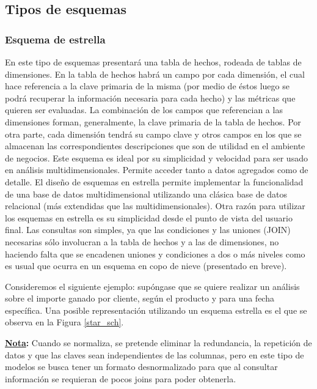 \documentclass[a4paper,11pt]{article}
\begin{document}
\begin{flushleft}
    
    \subsection{Tipos de esquemas}
    
    \subsubsection{Esquema de estrella}
    
    En este tipo de esquemas presentará una tabla de hechos, rodeada de tablas de dimensiones. En la tabla de hechos habrá un campo por cada dimensión, el
    cual hace referencia a la clave primaria de la misma (por medio de éstos luego se podrá recuperar la información necesaria para cada hecho) 
    y las métricas que quieren ser evaluadas. La combinación de los campos que referencian a las dimensiones forman, generalmente, la clave primaria de la
    tabla de hechos. Por otra parte, cada dimensión tendrá su campo clave y otros campos en los que se almacenan las correspondientes descripciones que son 
    de utilidad en el ambiente de negocios. Este esquema es ideal por su simplicidad y velocidad para ser usado en análisis multidimensionales. Permite 
    acceder tanto a datos agregados como de detalle. El diseño de esquemas en estrella permite implementar la funcionalidad de una base de datos 
    multidimensional utilizando una clásica base de datos relacional (más extendidas que las multidimensionales). Otra razón para utilizar los esquemas en 
    estrella es su simplicidad desde el punto de vista del usuario final. Las consultas son simples, ya que las condiciones y las uniones (JOIN) 
    necesarias sólo involucran a la tabla de hechos y a las de dimensiones, no haciendo falta que se encadenen uniones y condiciones a dos o más niveles como 
    es usual que ocurra en un esquema en copo de nieve (presentado en breve).\par
    Consideremos el siguiente ejemplo: supóngase que se quiere realizar un análisis sobre el importe ganado por cliente, según el producto y para una fecha
    específica. Una posible representación utilizando un esquema estrella es el que se observa en la Figura \ref{star_sch}.\par
    
    \textbf{\underline{Nota}:} Cuando se normaliza, se pretende eliminar la redundancia, la repetición de datos y que las claves sean independientes de
    las columnas, pero en este tipo de modelos se busca tener un formato desnormalizado para que al consultar información se requieran de pocos joins para
    poder obtenerla.
    

\end{flushleft}
\end{document}
